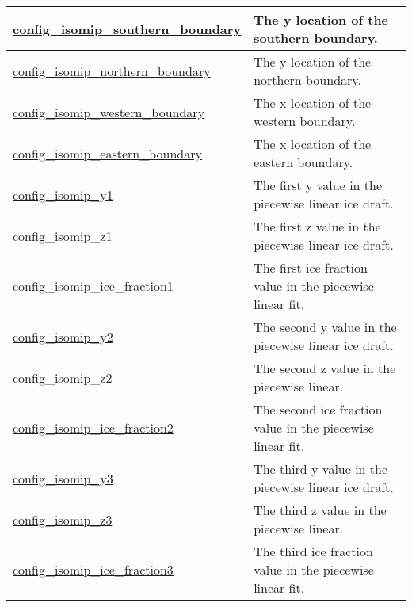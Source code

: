 {\begin{center}
\begin{longtable}{| p{2.0in} || p{4.0in} |}
    \hline
    \hyperref[subsec:nm_sec_config_isomip_southern_boundary]{config\_isomip\_southern\_\-boundary} & The y location of the southern boundary. \\
    \hline
    \hyperref[subsec:nm_sec_config_isomip_northern_boundary]{config\_isomip\_northern\_\-boundary} & The y location of the northern boundary. \\
    \hline
    \hyperref[subsec:nm_sec_config_isomip_western_boundary]{config\_isomip\_western\_\-boundary} & The x location of the western boundary. \\
    \hline
    \hyperref[subsec:nm_sec_config_isomip_eastern_boundary]{config\_isomip\_eastern\_\-boundary} & The x location of the eastern boundary. \\
    \hline
    \hyperref[subsec:nm_sec_config_isomip_y1]{config\_isomip\_y1} & The first y value in the piecewise linear ice draft. \\
    \hline
    \hyperref[subsec:nm_sec_config_isomip_z1]{config\_isomip\_z1} & The first z value in the piecewise linear ice draft. \\
    \hline
    \hyperref[subsec:nm_sec_config_isomip_ice_fraction1]{config\_isomip\_ice\_fraction1} & The first ice fraction value in the piecewise linear fit. \\
    \hline
    \hyperref[subsec:nm_sec_config_isomip_y2]{config\_isomip\_y2} & The second y value in the piecewise linear ice draft. \\
    \hline
    \hyperref[subsec:nm_sec_config_isomip_z2]{config\_isomip\_z2} & The second z value in the piecewise linear. \\
    \hline
    \hyperref[subsec:nm_sec_config_isomip_ice_fraction2]{config\_isomip\_ice\_fraction2} & The second ice fraction value in the piecewise linear fit. \\
    \hline
    \hyperref[subsec:nm_sec_config_isomip_y3]{config\_isomip\_y3} & The third y value in the piecewise linear ice draft. \\
    \hline
    \hyperref[subsec:nm_sec_config_isomip_z3]{config\_isomip\_z3} & The third z value in the piecewise linear. \\
    \hline
    \hyperref[subsec:nm_sec_config_isomip_ice_fraction3]{config\_isomip\_ice\_fraction3} & The third ice fraction value in the piecewise linear fit. \\
    \hline
\end{longtable}
\end{center}
}
